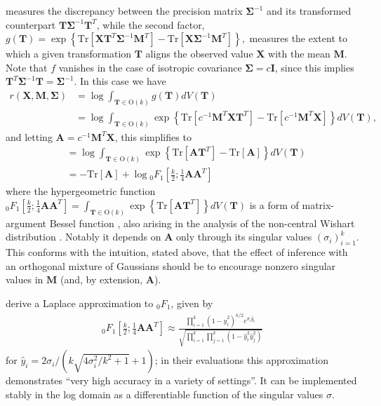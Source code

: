 \documentclass{article}
\newcommand{\Tr}{\text{Tr}}
\renewcommand{\O}{\text{O}}
\renewcommand{\v}[1]{\mathbf{#1}}
\newcommand{\I}{\v{I}}
\newcommand*\pFq[2]{{}_{#1}F_{#2}}%
\begin{document}
measures the discrepancy between the precision matrix $\v{\Sigma}^{-1}$ and its
transformed counterpart $\v{T}\v{\Sigma}^{-1}\v{T}^T$, while the second factor, $g(\v{T}) = \exp\left\{\Tr\left[\v{X}\v{T}^T\v{\Sigma}^{-1}\v{M}^T \right] -
  \Tr\left[\v{X}\v{\Sigma}^{-1}\v{M}^T\right]\right\},$ measures the extent to which a
given transformation $\v{T}$ aligns the observed value $\v{X}$ with the mean
$\v{M}$. Note that $f$ vanishes in the case of isotropic covariance $\v{\Sigma} = c\I$, since this implies
$\v{T}^T\v{\Sigma}^{-1}\v{T} = \v{\Sigma}^{-1}$. In this case we have
\begin{align*}
r(\v{X}, \v{M}, \v{\Sigma}) &= \log \int_{\v{T}\in \O(k)}  g(\v{T}) dV(\v{T})\\
&= \log \int_{\v{T}\in \O(k)}  \exp\left\{\Tr\left[c^{-1} \v{M}^T\v{X}\v{T}^T \right] -
  \Tr\left[c^{-1}\v{M}^T \v{X}\right]\right\} dV(\v{T}),
\end{align*}
and letting $\v{A} = c^{-1}\v{M}^T \v{X}$, this simplifies to
\begin{align*}
&= \log \int_{\v{T}\in \O(k)}  \exp\left\{\Tr\left[\v{A}\v{T}^T \right] - \Tr\left[\v{A}\right]\right\} dV(\v{T})\\
&= - \Tr\left[\v{A}\right] + \log \pFq{0}{1}\left[\frac{k}{2}; \frac{1}{4}\v{A}\v{A}^T\right]
\end{align*}
where the hypergeometric function $\pFq{0}{1}\left[\frac{k}{2}; \frac{1}{4}\v{A}\v{A}^T\right] = \int_{\v{T}\in \O(k)}  \exp\left\{\Tr\left[\v{A}\v{T}^T \right]\right\}
  dV(\v{T})$ is a form of matrix-argument Bessel function
  \citep{herz1955bessel}, also
  arising in the analysis of the non-central Wishart distribution
  \citep{muirhead1982aspects}. Notably it depends on $\v{A}$ only
  through its singular values $(\sigma_i)_{i=1}^k$. This conforms with
  the intuition, stated above, that the effect of inference with an orthogonal
  mixture of Gaussians should be to encourage nonzero singular values
  in $\v{M}$ (and, by extension, $\v{A}$). 

\citet{butler2003laplace} derive a Laplace approximation to $\pFq{0}{1}$,
given by
\begin{align}
\pFq{0}{1}\left[\frac{k}{2}; \frac{1}{4}\v{A}\v{A}^T\right] \approx
  \frac{\prod_{i=1}^k (1-\hat{y}_i^2)^{k/2}e^{\sigma_i\hat{y}_i}}
  {\sqrt{\prod_{i=1}^k\prod_{j=1}^k (1-\hat{y}_i^2 \hat{y}_j^2)}}\label{eqn:laplace}
\end{align}
for $\hat{y}_i = 2\sigma_i/(k \sqrt{4\sigma_i^2 / k^2 + 1} +
1)$; in their evaluations this approximation demonstrates ``very high
accuracy in a variety of settings''. It can be implemented stably in the log domain as a differentiable
function of the singular values $\sigma$. 
\end{document}
